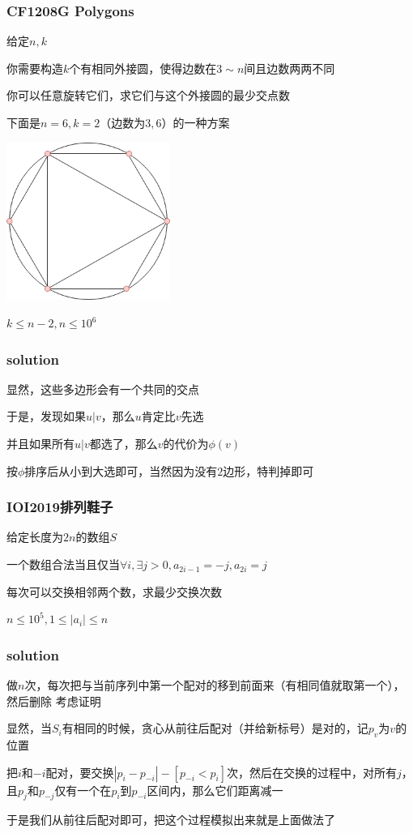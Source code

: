 \documentclass[10pt]{beamer}
\begin{document}
	\begin{frame}
		\frametitle{CF1208G Polygons}
		\par 给定$n,k$
		\par 你需要构造$k$个有相同外接圆，使得边数在$3\sim n$间且边数两两不同
		\par 你可以任意旋转它们，求它们与这个外接圆的最少交点数
		\par 下面是$n=6,k=2$（边数为$3,6$）的一种方案
		\par \includegraphics[width = 0.4\textwidth]{1.png}
		\par $k\le n-2,n\le 10^6$
	\end{frame}
	\clearpage
	\begin{frame}
		\frametitle{solution}
		 显然，这些多边形会有一个共同的交点

		 于是，发现如果$u|v$，那么$u$肯定比$v$先选

		 并且如果所有$u|v$都选了，那么$v$的代价为$\phi(v)$

		 按$\phi$排序后从小到大选即可，当然因为没有$2$边形，特判掉即可
	\end{frame}
	\clearpage
	\begin{frame}
		\frametitle{IOI2019排列鞋子}
		\par 给定长度为$2n$的数组$S$
		\par 一个数组合法当且仅当$\forall i,\exists j>0,a_{2i-1}=-j,a_{2i}=j$
		\par 每次可以交换相邻两个数，求最少交换次数
		\par $n\le 10^5,1\le |a_i|\le n$
	\end{frame}
	\clearpage
	\begin{frame}
		\frametitle{solution}
		 做$n$次，每次把与当前序列中第一个配对的移到前面来（有相同值就取第一个），然后删除
		\onslide<2-> 考虑证明

		 显然，当$S_i$有相同的时候，贪心从前往后配对（并给新标号）是对的，记$p_v$为$v$的位置

		 把$i$和$−i$配对，要交换$|p_i−p_{−i}|−[p_{−i}<p_i]$次，然后在交换的过程中，对所有$j$，且$p_j$和$p_{−j}$仅有一个在$p_i$到$p_{−i}$区间内，那么它们距离减一

		 于是我们从前往后配对即可，把这个过程模拟出来就是上面做法了 
	\end{frame}
\end{document}
